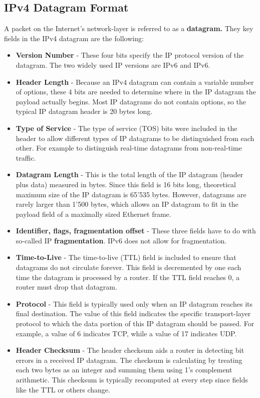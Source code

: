 \subsection{IPv4 Datagram Format}
A packet on the Internet's network-layer is referred to as a \textbf{datagram.} They key fields in the IPv4 datagram are the following:
\begin{itemize}
\item \textbf{Version Number} - These four bits specify the IP protocol version of the datagram. The two widely used IP versions are IPv6 and IPv6.
\item \textbf{Header Length} - Because an IPv4 datagram can contain a variable number of options, these 4 bits are needed to determine where in the IP datagram the payload actually begins. Most IP datagrams do not contain options, so the typical IP datagram header is 20 bytes long.
\item \textbf{Type of Service} - The type of service (TOS) bits were included in the header to allow different types of IP datagrams to be distinguished from each other. For example to distinguish real-time datagrams from non-real-time traffic. 
\item \textbf{Datagram Length} - This is the total length of the IP datagram (header plus data) measured in bytes. Since this field is 16 bits long, theoretical maximum size of the IP datagram is 65'535 bytes. However, datagrams are rarely larger than 1'500 bytes, which allows an IP datagram to fit in the payload field of a maximally sized Ethernet frame.
\item \textbf{Identifier, flags, fragmentation offset} - These three fields have to do with so-called IP \textbf{fragmentation}. IPv6 does not allow for fragmentation.
\item \textbf{Time-to-Live} - The time-to-live (TTL) field is included to ensure that datagrams do not circulate forever. This field is decremented by one each time the datagram is processed by a router. If the TTL field reaches 0, a router must drop that datagram.
\item \textbf{Protocol} - This field is typically used only when an IP datagram reaches its final destination. The value of this field indicates the specific transport-layer protocol to which the data portion of this IP datagram should be passed. For example, a value of 6 indicates TCP, while a value of 17 indicates UDP. 
\item \textbf{Header Checksum} - The header checksum aids a router in detecting bit errors in a received IP datagram. The checksum is calculating by treating each two bytes as an integer and summing them using 1's complement arithmetic. This checksum is typically recomputed at every step since fields like the TTL or others change.

\end{itemize}
